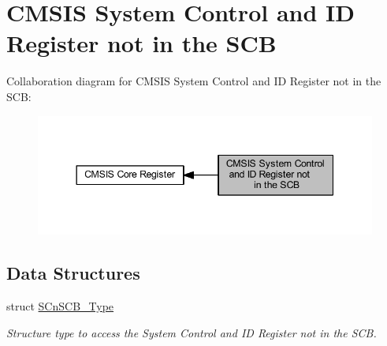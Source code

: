 \hypertarget{group___c_m_s_i_s___s_cn_s_c_b}{}\section{C\+M\+S\+IS System Control and ID Register not in the S\+CB}
\label{group___c_m_s_i_s___s_cn_s_c_b}
Collaboration diagram for C\+M\+S\+IS System Control and ID Register not in the S\+CB\+:
\nopagebreak
\begin{figure}[H]
\begin{center}
\leavevmode
\includegraphics[width=344pt]{group___c_m_s_i_s___s_cn_s_c_b}
\end{center}
\end{figure}
\subsection*{Data Structures}
\begin{DoxyCompactItemize}
\item 
struct \hyperlink{struct_s_cn_s_c_b___type}{S\+Cn\+S\+C\+B\+\_\+\+Type}
\begin{DoxyCompactList}\small\item\em Structure type to access the System Control and ID Register not in the S\+CB. \end{DoxyCompactList}\end{DoxyCompactItemize}
